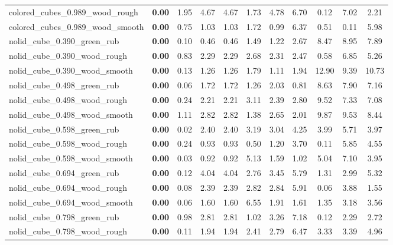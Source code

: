 \begin{table}[H]
{\begin{tabular}{l cccccccccc}
        colored\_cubes\_0.989\_wood\_rough & \textbf{0.00} & 1.95 & 4.67 & 4.67 & 1.73 & 4.78 & 6.70 & 0.12 & 7.02 & 2.21 \\
        colored\_cubes\_0.989\_wood\_smooth & \textbf{0.00} & 0.75 & 1.03 & 1.03 & 1.72 & 0.99 & 6.37 & 0.51 & 0.11 & 5.98 \\
        nolid\_cube\_0.390\_green\_rub & \textbf{0.00} & 0.10 & 0.46 & 0.46 & 1.49 & 1.22 & 2.67 & 8.47 & 8.95 & 7.89 \\
        nolid\_cube\_0.390\_wood\_rough & \textbf{0.00} & 0.83 & 2.29 & 2.29 & 2.68 & 2.31 & 2.47 & 0.58 & 6.85 & 5.26 \\
        nolid\_cube\_0.390\_wood\_smooth & \textbf{0.00} & 0.13 & 1.26 & 1.26 & 1.79 & 1.11 & 1.94 & 12.90 & 9.39 & 10.73 \\
        nolid\_cube\_0.498\_green\_rub & \textbf{0.00} & 0.06 & 1.72 & 1.72 & 1.26 & 2.03 & 0.81 & 8.63 & 7.90 & 7.16 \\
        nolid\_cube\_0.498\_wood\_rough & \textbf{0.00} & 0.24 & 2.21 & 2.21 & 3.11 & 2.39 & 2.80 & 9.52 & 7.33 & 7.08 \\
        nolid\_cube\_0.498\_wood\_smooth & \textbf{0.00} & 1.11 & 2.82 & 2.82 & 1.38 & 2.65 & 2.01 & 9.87 & 9.53 & 8.44 \\
        nolid\_cube\_0.598\_green\_rub & \textbf{0.00} & 0.02 & 2.40 & 2.40 & 3.19 & 3.04 & 4.25 & 3.99 & 5.71 & 3.97 \\
        nolid\_cube\_0.598\_wood\_rough & \textbf{0.00} & 0.24 & 0.93 & 0.93 & 0.50 & 1.20 & 3.70 & 0.11 & 5.85 & 4.55 \\
        nolid\_cube\_0.598\_wood\_smooth & \textbf{0.00} & 0.03 & 0.92 & 0.92 & 5.13 & 1.59 & 1.02 & 5.04 & 7.10 & 3.95 \\
        nolid\_cube\_0.694\_green\_rub & \textbf{0.00} & 0.12 & 4.04 & 4.04 & 2.76 & 3.45 & 5.79 & 1.31 & 2.99 & 5.32 \\
        nolid\_cube\_0.694\_wood\_rough & \textbf{0.00} & 0.08 & 2.39 & 2.39 & 2.82 & 2.84 & 5.91 & 0.06 & 3.88 & 1.55 \\
        nolid\_cube\_0.694\_wood\_smooth & \textbf{0.00} & 0.06 & 1.60 & 1.60 & 6.55 & 1.91 & 1.61 & 1.35 & 3.18 & 3.56 \\
        nolid\_cube\_0.798\_green\_rub & \textbf{0.00} & 0.98 & 2.81 & 2.81 & 1.02 & 3.26 & 7.18 & 0.12 & 2.29 & 2.72 \\
        nolid\_cube\_0.798\_wood\_rough & \textbf{0.00} & 0.11 & 1.94 & 1.94 & 2.41 & 2.79 & 6.47 & 3.33 & 3.39 & 4.96 \\

\end{tabular}}
\end{table}
